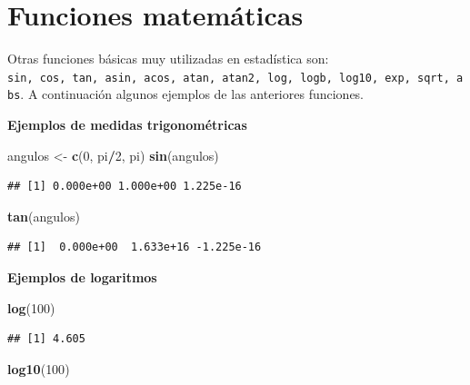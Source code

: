 \documentclass[10pt,]{krantz}
\makeatletter
\newenvironment{Shaded}{\begin{snugshade}}{\end{snugshade}}
\newcommand{\KeywordTok}[1]{\textcolor[rgb]{0.13,0.29,0.53}{\textbf{#1}}}
\newcommand{\DecValTok}[1]{\textcolor[rgb]{0.00,0.00,0.81}{#1}}
\newcommand{\StringTok}[1]{\textcolor[rgb]{0.31,0.60,0.02}{#1}}
\newcommand{\OperatorTok}[1]{\textcolor[rgb]{0.81,0.36,0.00}{\textbf{#1}}}
\newcommand{\NormalTok}[1]{#1}
\newenvironment{kframe}{%
\medskip{}
\setlength{\fboxsep}{.8em}
 \def\at@end@of@kframe{}%
 \ifinner\ifhmode%
  \def\at@end@of@kframe{\end{minipage}}%
  \begin{minipage}{\columnwidth}%
 \fi\fi%
 \def\FrameCommand##1{\hskip\@totalleftmargin \hskip-\fboxsep
 \colorbox{shadecolor}{##1}\hskip-\fboxsep
     \hskip-\linewidth \hskip-\@totalleftmargin \hskip\columnwidth}%
 \MakeFramed {\advance\hsize-\width
   \@totalleftmargin\z@ \linewidth\hsize
   \@setminipage}}%
 {\par\unskip\endMakeFramed%
 \at@end@of@kframe}
\renewenvironment{Shaded}{\begin{kframe}}{\end{kframe}}
\makeatother
\begin{document}
\section{Funciones matemáticas}\label{funciones-matematicas}

Otras funciones básicas muy utilizadas en estadística son:
\texttt{sin,\ cos,\ tan,\ asin,\ acos,\ atan,\ atan2,\ log,\ logb,\ log10,\ exp,\ sqrt,\ abs}.
A continuación algunos ejemplos de las anteriores funciones.

\textbf{Ejemplos de medidas trigonométricas}

\begin{Shaded}
\begin{Highlighting}[]
\NormalTok{angulos <-}\StringTok{ }\KeywordTok{c}\NormalTok{(}\DecValTok{0}\NormalTok{, pi}\OperatorTok{/}\DecValTok{2}\NormalTok{, pi)}
\KeywordTok{sin}\NormalTok{(angulos)}
\end{Highlighting}
\end{Shaded}

\begin{verbatim}
## [1] 0.000e+00 1.000e+00 1.225e-16
\end{verbatim}

\begin{Shaded}
\begin{Highlighting}[]
\KeywordTok{tan}\NormalTok{(angulos)}
\end{Highlighting}
\end{Shaded}

\begin{verbatim}
## [1]  0.000e+00  1.633e+16 -1.225e-16
\end{verbatim}

\textbf{Ejemplos de logaritmos}

\begin{Shaded}
\begin{Highlighting}[]
\KeywordTok{log}\NormalTok{(}\DecValTok{100}\NormalTok{)}
\end{Highlighting}
\end{Shaded}

\begin{verbatim}
## [1] 4.605
\end{verbatim}

\begin{Shaded}
\begin{Highlighting}[]
\KeywordTok{log10}\NormalTok{(}\DecValTok{100}\NormalTok{)}
\end{Highlighting}
\end{Shaded}
\end{document}
